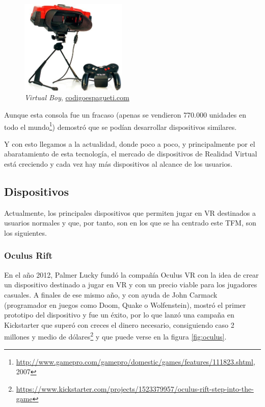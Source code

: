 \begin{figure}[!h]
    \begin{center}
        \includegraphics[width=0.45\textwidth]{imagenes/2/virtual-boy.jpg}
        \caption{\textit{Virtual Boy}, \url{codigoespagueti.com}}
        \label{fig:virtual-boy}
    \end{center}
\end{figure}

Aunque esta consola fue un fracaso (apenas se vendieron 770.000 unidades en todo el mundo\footnote{\url{http://www.gamepro.com/gamepro/domestic/games/features/111823.shtml}, 2007}) demostró que se podían desarrollar dispositivos similares.

Y con esto llegamos a la actualidad, donde poco a poco, y principalmente por el abaratamiento de esta tecnología, el mercado de dispositivos de Realidad Virtual está creciendo y cada vez hay más dispositivos al alcance de los usuarios.

\subsection{Dispositivos}

Actualmente, los principales dispositivos que permiten jugar en \acs{VR} destinados a usuarios normales y que, por tanto, son en los que se ha centrado este \acs{TFM}, son los siguientes.

\subsubsection{Oculus Rift} 

En el año 2012, Palmer Lucky fundó la compañía Oculus VR con la idea de crear un dispositivo destinado a jugar en \acs{VR} y con un precio viable para los jugadores casuales. A finales de ese mismo año, y con ayuda de John Carmack (programador en juegos como Doom, Quake o Wolfenstein), mostró el primer prototipo del dispositivo y fue un éxito, por lo que lanzó una campaña en Kickstarter que superó con creces el dinero necesario, consiguiendo caso 2 millones y medio de dólares\footnote{\url{https://www.kickstarter.com/projects/1523379957/oculus-rift-step-into-the-game}} y que puede verse en la figura \ref{fig:oculus}.
    
